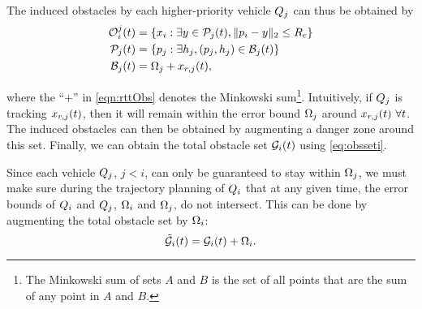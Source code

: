 %

The induced obstacles by each higher-priority vehicle $Q_j$ can thus be obtained by
\begin{equation} 
\label{eqn:rttObs}
\begin{aligned}
\ioset_i^j(t) &=  \{\state_i: \exists y \in \pfrs_j(t), \|\pos_i - y\|_2 \le \rc \} \\
\pfrs_j(t) &= \{\pos_j: \exists \npos_j, (\pos_j, \npos_j) \in \boset_j(t)\} \\
\boset_j(t) &= \disckernel_j  + \state_{r,j}(t),
\end{aligned}
\end{equation}

\noindent where the ``$+$'' in \eqref{eqn:rttObs} denotes the Minkowski sum\footnote{The Minkowski sum of sets $A$ and $B$ is the set of all points that are the sum of any point in $A$ and $B$.}. Intuitively, if $Q_j$ is tracking $x_{r,j}(t)$, then it will remain within the error bound $\Omega_j$ around $x_{r,j}(t) ~\forall t$.  The induced obstacles can then be obtained by augmenting a danger zone around this set. Finally, we can obtain the total obstacle set $\mathcal{G}_i(t)$ using \eqref{eq:obsseti}. 

Since each vehicle $Q_j$, $j<i$, can only be guaranteed to stay within $\Omega_j$, we must make sure during the trajectory planning of $Q_i$ that at any given time, the error bounds of $Q_i$ and $Q_j$, $\Omega_i$ and $\Omega_j$, do not intersect. This can be done by augmenting the total obstacle set by $\Omega_i$:%
\vspace{-0.1cm}
\begin{equation} 
\label{eqn:rttAugObs}
\tilde{\obsset}_i(t) = \obsset_i(t) + \disckernel_i.
\end{equation}

